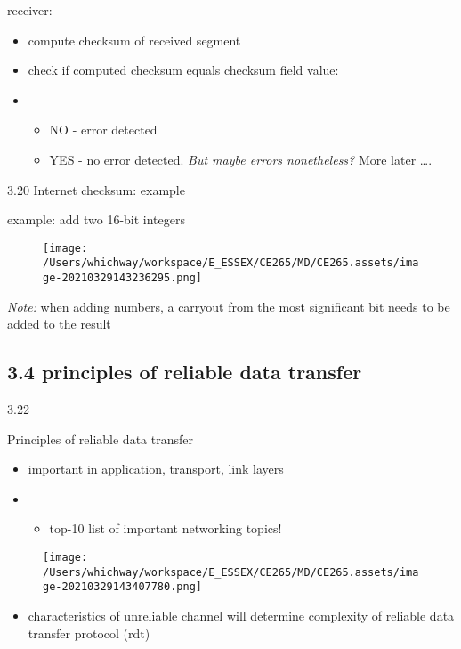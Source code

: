 \documentclass[
]{article}
\begin{document}
receiver:

\begin{itemize}
\item
  compute checksum of received segment
\item
  check if computed checksum equals checksum field value:
\item
  \begin{itemize}
  \item
    NO - error detected
  \item
    YES - no error detected. \emph{But maybe errors nonetheless?} More
    later \ldots.
  \end{itemize}
\end{itemize}

3.20 Internet checksum: example

example: add two 16-bit integers

\begin{figure}
\centering
\texttt{[image: /Users/whichway/workspace/E\_ESSEX/CE265/MD/CE265.assets/image-20210329143236295.png]}
\caption{}
\end{figure}

\emph{Note:} when adding numbers, a carryout from the most significant
bit needs to be added to the result

\hypertarget{34-principles-of-reliable-data-transfer}{%
\subsection{3.4 principles of reliable data
transfer}\label{34-principles-of-reliable-data-transfer}}

3.22

Principles of reliable data transfer

\begin{itemize}
\item
  important in application, transport, link layers
\item
  \begin{itemize}
  \item
    top-10 list of important networking topics!
  \end{itemize}
\end{itemize}

\begin{figure}
\centering
\texttt{[image: /Users/whichway/workspace/E\_ESSEX/CE265/MD/CE265.assets/image-20210329143407780.png]}
\caption{}
\end{figure}

\begin{itemize}
\item
  characteristics of unreliable channel will determine complexity of
  reliable data transfer protocol (rdt)
\end{itemize}
\end{document}
